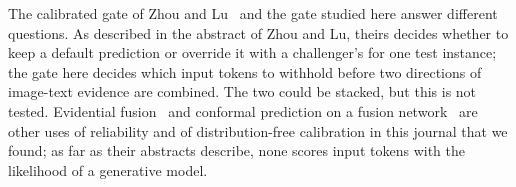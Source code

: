 The calibrated gate of Zhou and Lu~\cite{zhou2027burden} and the gate studied here answer different questions.
As described in the abstract of Zhou and Lu, theirs decides whether to keep a default prediction or override it with a challenger's for one test instance; the gate
here decides which input tokens to withhold before two directions of image-text evidence are combined.
The two could be stacked, but this is not tested.
Evidential fusion~\cite{shao2024ddef,huang2025evidential} and conformal prediction on a fusion network~\cite{wang2025multistage}
are other uses of reliability and of distribution-free calibration in this journal that we found; as far as their abstracts describe,
none scores input tokens with the likelihood of a generative model.


